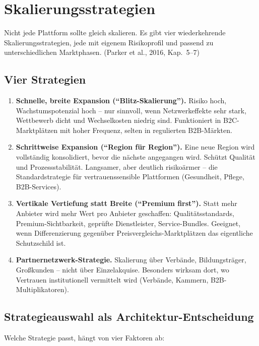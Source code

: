 \documentclass[11pt,a4paper,oneside]{article}
\newcommand{\quelle}[1]{{\footnotesize\color{lpGray}(#1)}}
\begin{document}
\section{Skalierungsstrategien}

Nicht jede Plattform sollte gleich skalieren. Es gibt vier wiederkehrende Skalierungsstrategien, jede mit eigenem Risikoprofil und passend zu unterschiedlichen Marktphasen. \quelle{Parker et al., 2016, Kap.~5--7}

\subsection{Vier Strategien}

\begin{enumerate}
  \item \textbf{Schnelle, breite Expansion (``Blitz-Skalierung'').} Risiko hoch, Wachstumspotenzial hoch -- nur sinnvoll, wenn Netzwerkeffekte sehr stark, Wettbewerb dicht und Wechselkosten niedrig sind. Funktioniert in B2C-Marktplätzen mit hoher Frequenz, selten in regulierten B2B-Märkten.
  \item \textbf{Schrittweise Expansion (``Region für Region'').} Eine neue Region wird vollständig konsolidiert, bevor die nächste angegangen wird. Schützt Qualität und Prozessstabilität. Langsamer, aber deutlich risikoärmer -- die Standardstrategie für vertrauenssensible Plattformen (Gesundheit, Pflege, B2B-Services).
  \item \textbf{Vertikale Vertiefung statt Breite (``Premium first'').} Statt mehr Anbieter wird mehr Wert pro Anbieter geschaffen: Qualitätsstandards, Premium-Sichtbarkeit, geprüfte Dienstleister, Service-Bundles. Geeignet, wenn Differenzierung gegenüber Preisvergleichs-Marktplätzen das eigentliche Schutzschild ist.
  \item \textbf{Partnernetzwerk-Strategie.} Skalierung über Verbände, Bildungsträger, Großkunden -- nicht über Einzelakquise. Besonders wirksam dort, wo Vertrauen institutionell vermittelt wird (Verbände, Kammern, B2B-Multiplikatoren).
\end{enumerate}

\subsection{Strategieauswahl als Architektur-Entscheidung}

Welche Strategie passt, hängt von vier Faktoren ab:
\end{document}
